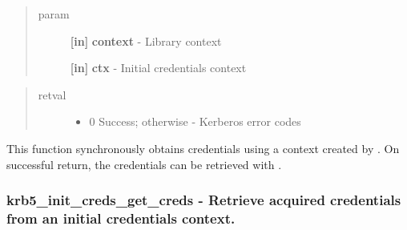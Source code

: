 \documentclass[letterpaper,10pt,english]{sphinxmanual}
\begin{document}
\begin{quote}\begin{description}
\item[{param}] \leavevmode
\textbf{{[}in{]}} \textbf{context} - Library context

\textbf{{[}in{]}} \textbf{ctx} - Initial credentials context

\end{description}\end{quote}
\begin{quote}\begin{description}
\item[{retval}] \leavevmode\begin{itemize}
\item {} 
0   Success; otherwise - Kerberos error codes

\end{itemize}

\end{description}\end{quote}

This function synchronously obtains credentials using a context created by {\hyperref[appdev/refs/api/krb5_init_creds_init:c.krb5_init_creds_init]{}} . On successful return, the credentials can be retrieved with {\hyperref[appdev/refs/api/krb5_init_creds_get_creds:c.krb5_init_creds_get_creds]{}} .


\subsubsection{krb5\_init\_creds\_get\_creds -  Retrieve acquired credentials from an initial credentials context.}
\label{appdev/refs/api/krb5_init_creds_get_creds::doc}\label{appdev/refs/api/krb5_init_creds_get_creds:krb5-init-creds-get-creds-retrieve-acquired-credentials-from-an-initial-credentials-context}

\begin{fulllineitems}
\label{appdev/refs/api/krb5_init_creds_get_creds:c.krb5_init_creds_get_creds}
\end{fulllineitems}
\end{document}
